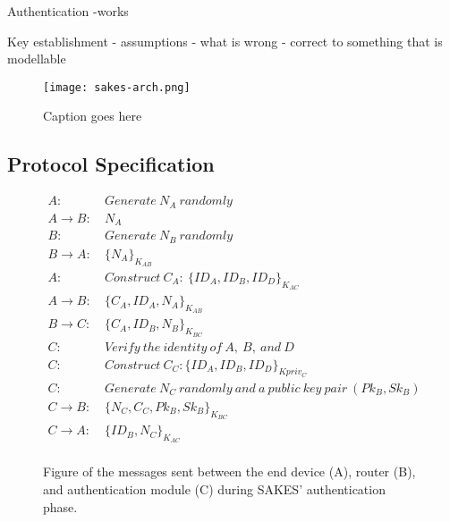 Authentication
-works


Key establishment
- assumptions
- what is wrong
- correct to something that is modellable

\begin{figure}
	\centering
	\texttt{[image: sakes-arch.png]}
	\caption{Caption goes here}
	\label{fig:sakes-arch}
\end{figure}

\subsection{Protocol Specification}

\begin{figure}[h]
\begin{tcolorbox}[title=Authentication in SAKES]
\begin{align*}
A:\ & Generate\ N_A\ randomly\\
A \rightarrow B:\ & N_A\\
B:\ & Generate\ N_B\ randomly\\
B \rightarrow A:\ & \{N_A\}_{K_{AB}}\\
A:\ & Construct\ C_{A}:\ \{ID_A, ID_B, ID_D\}_{K_{AC}}\\
A \rightarrow B:\ & \{C_A, ID_A, N_A\}_{K_{AB}}\\
B \rightarrow C:\ & \{C_A, ID_B, N_B\}_{K_{BC}}\\
C:\ & Verify\ the\ identity\ of\ A,\ B,\ and\ D\\
C: \ & Construct\ C_C: \{ID_A, ID_B, ID_D\}_{Kpriv_{C}}\\
C:\ & Generate\ N_C\ randomly\ and\ a\ public\ key\ pair\ (Pk_B, Sk_B)\\
C \rightarrow B:\ & \{N_C, C_C, Pk_B, Sk_B\}_{K_{BC}}\\
C \rightarrow A:\ & \{ID_B, N_C\}_{K_{AC}}\\
\end{align*}
\end{tcolorbox}
\caption{Figure of the messages sent between the end device (A), router (B), and authentication module (C) during SAKES' authentication phase.}
\label{fig:sakes-auth}
\end{figure}




